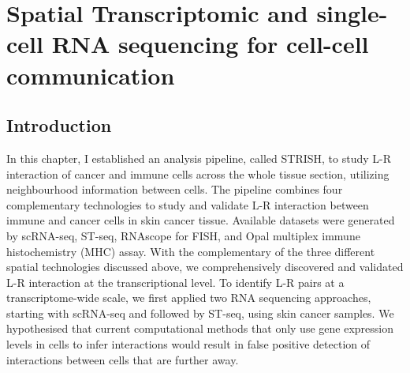 \cleartoevenpage
\pagestyle{empty}	

\chapter[Spatial transcriptomic and single-cell RNA sequencing for cell-cell communication]{Spatial Transcriptomic and single-cell RNA sequencing for cell-cell communication}
\label{Chap:2}	%
\pagestyle{headings}
\section{Introduction}
\label{Sec:2.1_intro}	%
In this chapter, I established an analysis pipeline, called STRISH, to study L-R interaction of cancer and immune cells across the whole tissue section, utilizing neighbourhood information between cells. The pipeline combines four complementary technologies to study and validate L-R interaction between immune and cancer cells in skin cancer tissue. Available datasets were generated by scRNA-seq, ST-seq, RNAscope for FISH, and Opal multiplex immune histochemistry (MHC) assay. With the complementary of the three different spatial technologies discussed above, we comprehensively discovered and validated L-R interaction at the transcriptional level. To identify L-R pairs at a transcriptome-wide scale, we first applied two RNA sequencing approaches, starting with scRNA-seq and followed by ST-seq, using skin cancer samples. We hypothesised that current computational methods that only use gene expression levels in cells to infer interactions would result in false positive detection of interactions between cells that are further away.

